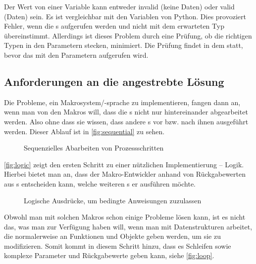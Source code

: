       Der Wert von einer  Variable kann entweder invalid (keine Daten) oder valid (Daten) sein. Es ist vergleichbar mit den Variablen von Python. Dies provoziert Fehler, wenn die s aufgerufen werden und nicht mit dem erwarteten Typ übereinstimmt. Allerdings ist dieses Problem durch eine Prüfung, ob die richtigen Typen in den  Parametern stecken, minimiert. Die Prüfung findet in dem  statt, bevor das  mit den Parametern aufgerufen wird.

  \subsection{Anforderungen an die angestrebte Lösung}
  \label{ssec:Anforderungen an die angestrebte Lösung}
    Die Probleme, ein Makrosystem/-sprache zu implementieren, fangen dann an, wenn man von den Makros will, dass die s nicht nur hintereinander abgearbeitet werden. Also ohne dass sie wissen, dass andere s vor bzw. nach ihnen ausgeführt werden. Dieser Ablauf ist in \autoref{fig:sequential} zu sehen.

    \begin{figure}[H]
      \centering
      \caption{Sequenzielles Abarbeiten von Prozessschritten}
      \label{fig:sequential}
    \end{figure}

    \autoref{fig:logic} zeigt den ersten Schritt zu einer nützlichen Implementierung -- Logik. Hierbei bietet man an, dass der Makro-Entwickler anhand von Rückgabewerten aus s entscheiden kann, welche weiteren s er ausführen möchte.

    \begin{figure}[H]
      \centering
      \caption{Logische Ausdrücke, um bedingte Anweisungen zuzulassen}
      \label{fig:logic}
    \end{figure}

    Obwohl man mit solchen Makros schon einige Probleme lösen kann, ist es nicht das, was man zur Verfügung haben will, wenn man mit Datenstrukturen arbeitet, die normalerweise an Funktionen und Objekte geben werden, um sie zu modifizieren. Somit kommt in diesem Schritt hinzu, dass es Schleifen sowie komplexe Parameter und Rückgabewerte geben kann, siehe \autoref{fig:loop}.

